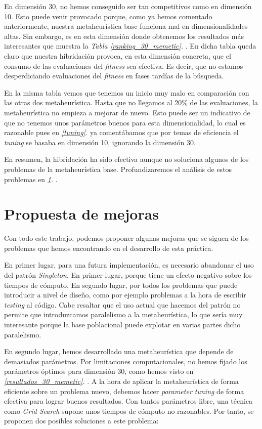 \documentclass[11pt]{article}
\begin{document}
En dimensión 30, no hemos conseguido ser tan competitivos como en dimensión 10. Esto puede venir provocado porque, como ya hemos comentado anteriormente, nuestra metaheurística base funciona mal en dimensionalidades altas. Sin embargo, es en esta dimensión donde obtenemos los resultados más interesantes que muestra la \emph{Tabla \ref{ranking_30_memetic}. }. En dicha tabla queda claro que nuestra hibridación provoca, en esta dimensión concreta, que el consumo de las evaluaciones del \emph{fitness} sea efectiva. Es decir, que no estamos desperdiciando evaluaciones del \emph{fitness} en fases tardías de la búsqueda.

En la misma tabla vemos que tenemos un inicio muy malo en comparación con las otras dos metaheurística. Hasta que no llegamos al 20\% de las evaluaciones, la metaheurística no empieza a mejorar de nuevo. Esto puede ser un indicativo de que no tenemos unos parámetros buenos para esta dimensionalidad, lo cual es razonable pues en \emph{\ref{tuning}. } ya comentábamos que por temas de eficiencia el \emph{tuning} se basaba en dimensión 10, ignorando la dimensión 30.

En resumen, la hibridación ha sido efectiva aunque no soluciona algunos de los problemas de la metaheurística base. Profundizaremos el análisis de estos problemas en \emph{\ref{mejoras}. }.

\pagebreak
\section{Propuesta de mejoras} \label{mejoras}

Con todo este trabajo, podemos proponer algunas mejoras que se siguen de los problemas que hemos encontrando en el desarrollo de esta práctica.

En primer lugar, para una futura implementación, es necesario abandonar el uso del patrón \emph{Singleton}. En primer lugar, porque tiene un efecto negativo sobre los tiempos de cómputo. En segundo lugar, por todos los problemas que puede introducir a nivel de diseño, como por ejemplo problemas a la hora de escribir \emph{testing} al código. Cabe resaltar que el uso actual que hacemos del patrón no permite que introduzcamos paralelismo a la metaheurística, lo que sería muy interesante porque la base poblacional puede explotar en varias partes dicho paralelismo.

En segundo lugar, hemos desarrollado una metaheurística que depende de demasiados parámetros. Por limitaciones computacionales, no hemos fijado los parámetros óptimos para dimensión 30, como hemos visto en \emph{\ref{resultados_30_memetic}. }. A la hora de aplicar la metaheurística de forma eficiente sobre un problema nuevo, debemos hacer \emph{parameter tuning} de forma efectiva para lograr buenos resultados. Con tantos parámetros libre, una técnica como \emph{Grid Search} supone unos tiempos de cómputo no razonables. Por tanto, se proponen dos posibles soluciones a este problema:
\end{document}
